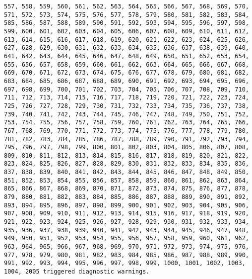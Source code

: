 \documentclass[
  letterpaper,
  DIV=11,
  numbers=noendperiod]{scrartcl}
\begin{document}
\begin{verbatim}
557, 558, 559, 560, 561, 562, 563, 564, 565, 566, 567, 568, 569, 570, 571, 572, 573, 574, 575, 576, 577, 578, 579, 580, 581, 582, 583, 584, 585, 586, 587, 588, 589, 590, 591, 592, 593, 594, 595, 596, 597, 598, 599, 600, 601, 602, 603, 604, 605, 606, 607, 608, 609, 610, 611, 612, 613, 614, 615, 616, 617, 618, 619, 620, 621, 622, 623, 624, 625, 626, 627, 628, 629, 630, 631, 632, 633, 634, 635, 636, 637, 638, 639, 640, 641, 642, 643, 644, 645, 646, 647, 648, 649, 650, 651, 652, 653, 654, 655, 656, 657, 658, 659, 660, 661, 662, 663, 664, 665, 666, 667, 668, 669, 670, 671, 672, 673, 674, 675, 676, 677, 678, 679, 680, 681, 682, 683, 684, 685, 686, 687, 688, 689, 690, 691, 692, 693, 694, 695, 696, 697, 698, 699, 700, 701, 702, 703, 704, 705, 706, 707, 708, 709, 710, 711, 712, 713, 714, 715, 716, 717, 718, 719, 720, 721, 722, 723, 724, 725, 726, 727, 728, 729, 730, 731, 732, 733, 734, 735, 736, 737, 738, 739, 740, 741, 742, 743, 744, 745, 746, 747, 748, 749, 750, 751, 752, 753, 754, 755, 756, 757, 758, 759, 760, 761, 762, 763, 764, 765, 766, 767, 768, 769, 770, 771, 772, 773, 774, 775, 776, 777, 778, 779, 780, 781, 782, 783, 784, 785, 786, 787, 788, 789, 790, 791, 792, 793, 794, 795, 796, 797, 798, 799, 800, 801, 802, 803, 804, 805, 806, 807, 808, 809, 810, 811, 812, 813, 814, 815, 816, 817, 818, 819, 820, 821, 822, 823, 824, 825, 826, 827, 828, 829, 830, 831, 832, 833, 834, 835, 836, 837, 838, 839, 840, 841, 842, 843, 844, 845, 846, 847, 848, 849, 850, 851, 852, 853, 854, 855, 856, 857, 858, 859, 860, 861, 862, 863, 864, 865, 866, 867, 868, 869, 870, 871, 872, 873, 874, 875, 876, 877, 878, 879, 880, 881, 882, 883, 884, 885, 886, 887, 888, 889, 890, 891, 892, 893, 894, 895, 896, 897, 898, 899, 900, 901, 902, 903, 904, 905, 906, 907, 908, 909, 910, 911, 912, 913, 914, 915, 916, 917, 918, 919, 920, 921, 922, 923, 924, 925, 926, 927, 928, 929, 930, 931, 932, 933, 934, 935, 936, 937, 938, 939, 940, 941, 942, 943, 944, 945, 946, 947, 948, 949, 950, 951, 952, 953, 954, 955, 956, 957, 958, 959, 960, 961, 962, 963, 964, 965, 966, 967, 968, 969, 970, 971, 972, 973, 974, 975, 976, 977, 978, 979, 980, 981, 982, 983, 984, 985, 986, 987, 988, 989, 990, 991, 992, 993, 994, 995, 996, 997, 998, 999, 1000, 1001, 1002, 1003, 1004, 2005 triggered diagnostic warnings.


\end{verbatim}
\end{document}
